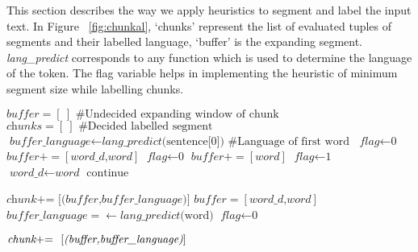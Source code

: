 \documentclass[11pt]{article}
\begin{document}
This section describes the way we apply heuristics to segment and label the input text.
In Figure ~\ref{fig:chunkal}, `chunks' represent the list of evaluated tuples of segments and their labelled language, `buffer' is the expanding segment.
 \textit{lang\_predict} corresponds to any function which is used to determine the language of the token. The flag 
variable helps in implementing the heuristic of minimum segment size while labelling chunks.
\begin{algorithm}
\caption*{\textsc{}}
{\fontsize{9}{9}\selectfont
\begin{algorithmic}[1]
\State $\textit{buffer} = [\ ] \text{\ \ \  \#Undecided expanding window of chunk}$
\State $\textit{chunks} = [\ ] \text{\ \ \  \#Decided labelled segment}$
\State $\textit{buffer\_language} \gets \textit{lang\_predict}\text{(sentence[0])} \text{\ \ \ \#Language of first word}$
\State $\textit{flag} \gets \text{0}$
        \State $\textit{buffer} += [\textit{word\_d,word}] $
        \State $\textit{flag} \gets \text{0}$
        \Else
        \State $\textit{buffer} += [\textit{word}] $
        \EndIf
        \EndIf
{}
        \State $\textit{flag} \gets \text{1}$
        \State $\textit{word\_d} \gets \textit{word} $
        \State $\text{continue}$

        \Else
        \State $\textit{chunk} \text{+= \ }  \textit{[(buffer,buffer\_language)]} $
        \State $\textit{buffer} = [\textit{word\_d,word}] $
        \State $\textit{buffer\_language} = \gets \textit{lang\_predict}\text{(word)}$%
        \State $\textit{flag} \gets \text{0}$
        \EndIf

\EndIf
\EndFor
{}
        \State $\textit{chunk} \text{+= \ }  \text{[\textit{(buffer,buffer\_language)}]} $

\EndIf
\end{algorithmic}}
\end{algorithm}
\end{document}
